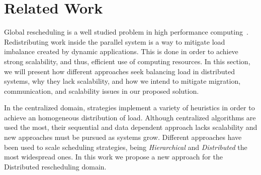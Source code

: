 \section{Related Work} \label{sec:rw}

%

Global rescheduling is a well studied problem in high performance computing~\cite{Deveci2015,Zheng2010}.
Redistributing work inside the parallel system is a way to mitigate load imbalance created by dynamic applications.
This is done in order to achieve strong scalability, and thus, efficient use of computing resources.
In this section, we will present how different approaches seek balancing load in distributed systems, why they lack scalability, and how we intend to mitigate migration, communication, and scalability issues in our proposed solution.


In the centralized domain, strategies implement a variety of heuristics in order to achieve an homogeneous distribution of load.
Although centralized algorithms are used the most, their sequential and data dependent approach lacks scalability and new approaches must be pursued as systems grow.
Different approaches have been used to scale scheduling strategies, being \textit{Hierarchical} and \textit{Distributed} the most widespread ones.
In this work we propose a new approach for the Distributed rescheduling domain.

